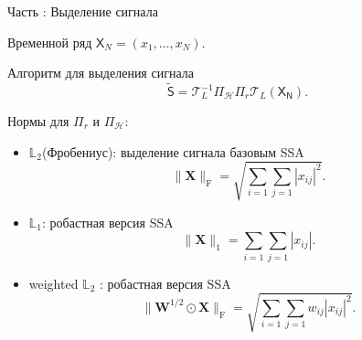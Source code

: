 \documentclass[10pt, ucs, notheorems, handout]{beamer}
\DeclareMathOperator{\med}{med}
\DeclareMathOperator*{\argmin}{argmin}
\newcommand{\tX}[1]{\mathsf{#1}}
\newcommand{\RomanNumeralCaps}[1]
{\MakeUppercase{\romannumeral #1}}
\begin{document}
\begin{frame}{Часть \RomanNumeralCaps{1}: Выделение сигнала}
	
	Временной ряд $\tX{X}_N=(x_1, \ldots, x_{N})$.
	\begin{block}{Алгоритм для выделения сигнала}
		\begin{equation*}
			\tilde{\tX{S}} = \mathcal{T}_L^{-1} \Pi_{\mathcal{H}} \Pi_{r} \mathcal{T}_L (\tX{X_N}).
		\end{equation*}
	\end{block}
	
	
	Нормы для $\Pi_r$ и $\Pi_{\mathcal{H}}$:
	\begin{itemize}
		\item $\mathbb{L}_2$(Фробениус): выделение сигнала базовым SSA
		$$\|\mathbf{X}\|_\mathrm{F} = \sqrt{\sum_{i = 1}\sum_{j = 1}|x_{ij}|^2}.$$
		\item $\mathbb{L}_1$: робастная версия SSA
		$$\|\mathbf{X}\|_1 = \sum_{i = 1}\sum_{j = 1}|x_{ij}|.$$
		\item weighted $\mathbb{L}_2$ : робастная версия SSA
		$$\|\mathbf{W}^{1/2}\odot\mathbf{X}\|_\mathrm{F} = \sqrt{\sum_{i = 1}\sum_{j = 1}w_{ij}|x_{ij}|^2}.$$
	\end{itemize}
	\note{}
\end{frame}

\end{document}
